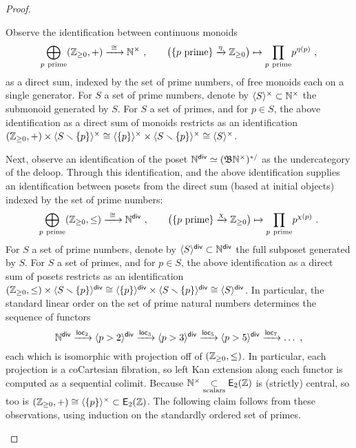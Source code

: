 \begin{proof}
\begin{itemize}
Observe the identification between continuous monoids 
\[
\underset{p~{\rm prime}} \bigoplus (\mathbb Z_{\geq 0},+)
\xrightarrow{~\cong~}
\mathbb N^\times
~,\qquad
\bigl(
\{ p~{\rm prime}\}
\xrightarrow{\eta}
\mathbb Z_{\geq 0}
\bigr)
\mapsto 
\underset{p~\rm prime}\prod p^{\eta(p)}
~,
\]
as a direct sum, indexed by the set of prime numbers, of free monoids each on a single generator.
For $S$ a set of prime numbers, denote by $\langle S \rangle^{\times} \subset \mathbb N^\times$ the submonoid generated by $S$.  
For $S$ a set of primes, and for $p\in S$, 
the above identification as a direct sum of monoids restricts as an identification $(\mathbb Z_{\geq 0},+ ) \times \langle S \smallsetminus \{p\} \rangle^{\times} \cong  \langle \{p\} \rangle^{\times}  \times \langle S \smallsetminus \{p\} \rangle^{\times}   \cong \langle S \rangle^{\times}$.

Next, observe an identification of the poset $\mathbb N^{\sf div} \simeq (\mathfrak B \mathbb N^\times)^{\ast/}$ as the undercategory of the deloop.  
Through this identification, and the above identification supplies an identification between posets from the direct sum (based at initial objects) indexed by the set of prime numbers:
\[
\underset{p~\rm prime} \bigoplus (\mathbb Z_{\geq 0},\leq)
\xrightarrow{~\cong~}
\mathbb N^{\sf div}
~,\qquad
\bigl(
\{ p~{\rm prime}\}
\xrightarrow{\chi}
\mathbb Z_{\geq 0}
\bigr)
\mapsto 
\underset{p~\rm prime}\prod p^{\chi(p)}
~.
\]
For $S$ a set of prime numbers, denote by $\langle S \rangle^{\sf div} \subset \mathbb N^{\sf div}$ the full subposet generated by $S$.  
For $S$ a set of primes, and for $p\in S$, 
the above identification as a direct sum of posets restricts as an identification $(\mathbb Z_{\geq 0},\leq ) \times \langle S \smallsetminus \{p\} \rangle^{\sf div} \cong  \langle \{p\} \rangle^{\sf div}  \times \langle S \smallsetminus \{p\} \rangle^{\sf div}   \cong \langle S \rangle^{\sf div}$.
In particular, 
the standard linear order on the set of prime natural numbers determines the sequence of functors
\begin{equation}
\label{e85}
\mathbb N^{\sf div}
\xrightarrow{{\sf loc}_2}
\langle p>2 \rangle^{\sf div}
\xrightarrow{{\sf loc}_3}
\langle p > 3 \rangle^{\sf div}
\xrightarrow{{\sf loc}_5}
\langle p > 5 \rangle^{\sf div}
\xrightarrow{{\sf loc}_7}
\dots
~,
\end{equation}
each which is isomorphic with projection off of $(\mathbb Z_{\geq 0},\leq)$.  
In particular, each projection is a coCartesian fibration, so left Kan extension along each functor is computed as a sequential colimit.  
Because $\mathbb N^\times \underset{\rm scalars}\subset \operatorname{\mathsf E_2(\mathbb Z)}$ is (strictly) central, 
so too is $(\mathbb Z_{\geq 0},+)\cong \langle \{p\}\rangle^{\times}\subset \operatorname{\mathsf E_2(\mathbb Z)}$.  
The following claim follows from these observations, using induction on the standardly ordered set of primes. 

\end{itemize}
\end{proof}
